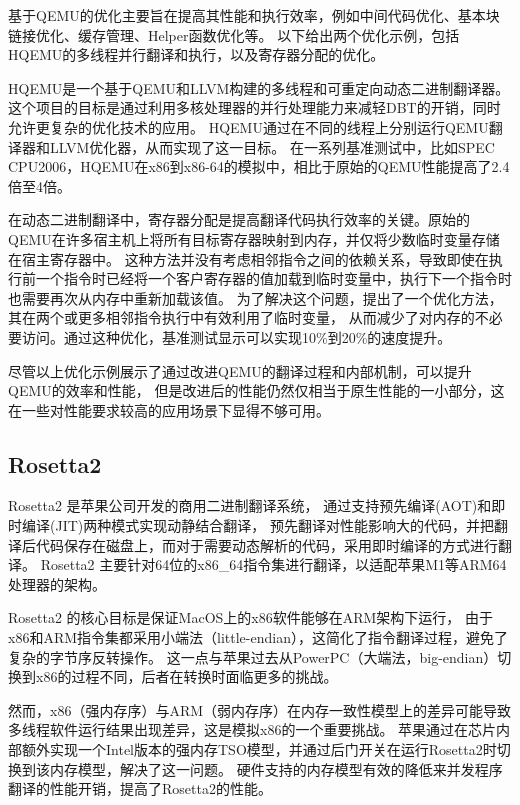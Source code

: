 基于QEMU的优化主要旨在提高其性能和执行效率，例如中间代码优化\cite{LiNan2021}、基本块链接优化\cite{Hong2012HQEMUAM}、缓存管理\cite{FengYue2010}、Helper函数优化\cite{Wang2021}等。
以下给出两个优化示例，包括HQEMU的多线程并行翻译和执行，以及寄存器分配的优化。

HQEMU\cite{Hong2012HQEMUAM}是一个基于QEMU和LLVM构建的多线程和可重定向动态二进制翻译器。
这个项目的目标是通过利用多核处理器的并行处理能力来减轻DBT的开销，同时允许更复杂的优化技术的应用。
HQEMU通过在不同的线程上分别运行QEMU翻译器和LLVM优化器，从而实现了这一目标。
在一系列基准测试中，比如SPEC CPU2006，HQEMU在x86到x86-64的模拟中，相比于原始的QEMU性能提高了2.4倍至4倍。

在动态二进制翻译中，寄存器分配是提高翻译代码执行效率的关键。原始的QEMU在许多宿主机上将所有目标寄存器映射到内存，并仅将少数临时变量存储在宿主寄存器中。
这种方法并没有考虑相邻指令之间的依赖关系，导致即使在执行前一个指令时已经将一个客户寄存器的值加载到临时变量中，执行下一个指令时也需要再次从内存中重新加载该值。
为了解决这个问题，\cite{Hong2012HQEMUAM}提出了一个优化方法，其在两个或更多相邻指令执行中有效利用了临时变量，
从而减少了对内存的不必要访问。通过这种优化，基准测试显示可以实现10\%到20\%的速度提升。

尽管以上优化示例展示了通过改进QEMU的翻译过程和内部机制，可以提升QEMU的效率和性能，
但是改进后的性能仍然仅相当于原生性能的一小部分，这在一些对性能要求较高的应用场景下显得不够可用。


\subsection{Rosetta2}

Rosetta2 是苹果公司开发的商用二进制翻译系统，
通过支持预先编译(AOT)和即时编译(JIT)两种模式实现动静结合翻译，
预先翻译对性能影响大的代码，并把翻译后代码保存在磁盘上，而对于需要动态解析的代码，采用即时编译的方式进行翻译。
Rosetta2 主要针对64位的x86\_64指令集进行翻译，以适配苹果M1等ARM64处理器的架构。

Rosetta2 的核心目标是保证MacOS上的x86软件能够在ARM架构下运行，
由于x86和ARM指令集都采用小端法（little-endian），这简化了指令翻译过程，避免了复杂的字节序反转操作。
这一点与苹果过去从PowerPC（大端法，big-endian）切换到x86的过程不同，后者在转换时面临更多的挑战。

然而，x86（强内存序）与ARM（弱内存序）在内存一致性模型上的差异可能导致多线程软件运行结果出现差异，这是模拟x86的一个重要挑战\cite{Risotto}。
苹果通过在芯片内部额外实现一个Intel版本的强内存TSO模型，并通过后门开关在运行Rosetta2时切换到该内存模型，解决了这一问题。
硬件支持的内存模型有效的降低来并发程序翻译的性能开销，提高了Rosetta2的性能。

